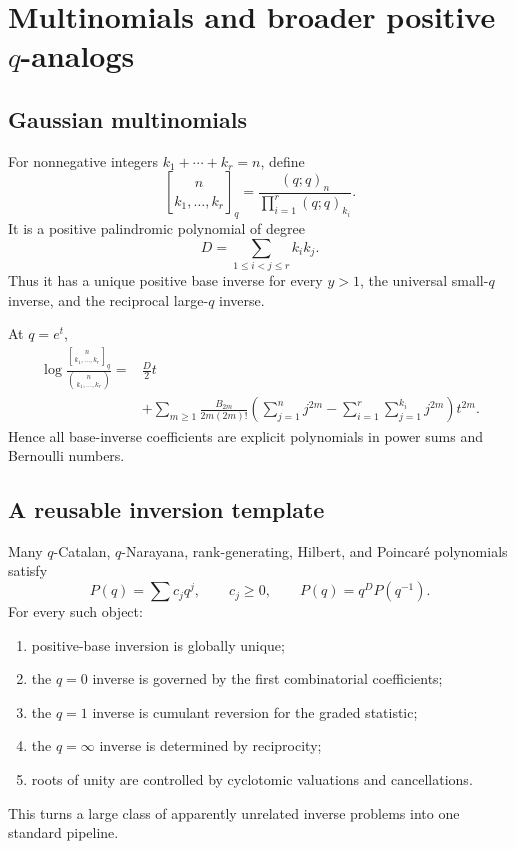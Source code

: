 \documentclass[11pt,letterpaper,oneside,openany]{book}
\theoremstyle{definition}
\theoremstyle{remark}
\newcommand{\qmultinom}[2]{\genfrac{[}{]}{0pt}{}{#1}{#2}_{q}}
\begin{document}
\chapter{Multinomials and broader positive \texorpdfstring{\(q\)}{q}-analogs}

\section{Gaussian multinomials}
For nonnegative integers \(k_1+\cdots+k_r=n\), define
\[
 \qmultinom{n}{k_1,\ldots,k_r}
 =\frac{(q;q)_n}{\prod_{i=1}^r(q;q)_{k_i}}.
\]
It is a positive palindromic polynomial of degree
\[
 D=\sum_{1\le i<j\le r}k_ik_j.
\]
Thus it has a unique positive base inverse for every \(y>1\), the universal
small-\(q\) inverse, and the reciprocal large-\(q\) inverse.

At \(q=e^t\),
\begin{align}
 \log\frac{\qmultinom{n}{k_1,\ldots,k_r}}
 {\binom{n}{k_1,\ldots,k_r}}
 ={}&\frac D2t\\
 &+\sum_{m\ge1}\frac{B_{2m}}{2m(2m)!}
 \left(\sum_{j=1}^n j^{2m}
 -\sum_{i=1}^r\sum_{j=1}^{k_i}j^{2m}\right)t^{2m}.
 \label{eq:multinomial-q1}
\end{align}
Hence all base-inverse coefficients are explicit polynomials in power sums and
Bernoulli numbers.

\section{A reusable inversion template}
Many \(q\)-Catalan, \(q\)-Narayana, rank-generating, Hilbert, and Poincar\'e
polynomials satisfy
\[
 P(q)=\sum c_jq^j,
 \qquad c_j\ge0,
 \qquad P(q)=q^DP(q^{-1}).
\]
For every such object:
\begin{enumerate}[label=(\roman*)]
\item positive-base inversion is globally unique;
\item the \(q=0\) inverse is governed by the first combinatorial coefficients;
\item the \(q=1\) inverse is cumulant reversion for the graded statistic;
\item the \(q=\infty\) inverse is determined by reciprocity;
\item roots of unity are controlled by cyclotomic valuations and cancellations.
\end{enumerate}
This turns a large class of apparently unrelated inverse problems into one
standard pipeline.
\end{document}
